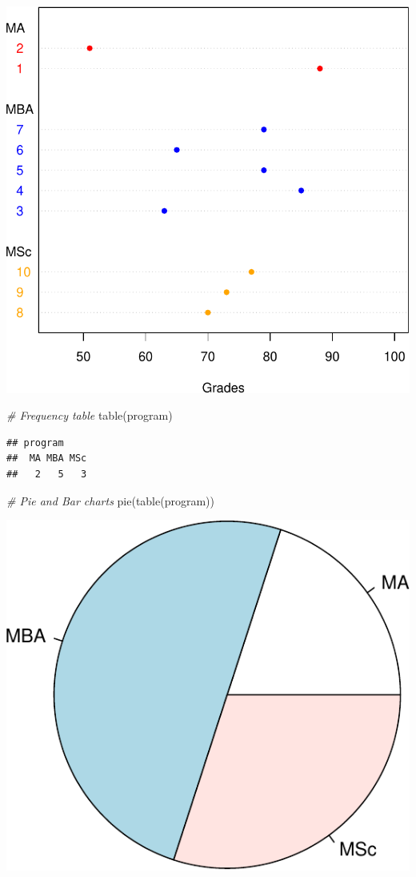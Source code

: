 \documentclass[
]{article}
\newcommand{\CommentTok}[1]{\textcolor[rgb]{0.56,0.35,0.01}{\textit{#1}}}
\newcommand{\FunctionTok}[1]{\textcolor[rgb]{0.00,0.00,0.00}{#1}}
\newcommand{\NormalTok}[1]{#1}
\begin{document}
\includegraphics[width=1\linewidth,height=1\textheight]{unnamed-chunk-26-1}

 

\begin{Highlighting}[]
\CommentTok{\# Frequency table}
\FunctionTok{table}\NormalTok{(program)}
\end{Highlighting}

\begin{verbatim}
## program
##  MA MBA MSc 
##   2   5   3
\end{verbatim}

\begin{Highlighting}[]
\CommentTok{\# Pie and Bar charts}
\FunctionTok{pie}\NormalTok{(}\FunctionTok{table}\NormalTok{(program))}
\end{Highlighting}

\begin{center}\includegraphics[width=0.5\linewidth,height=0.5\textheight]{unnamed-chunk-27-1} \end{center}
\end{document}
